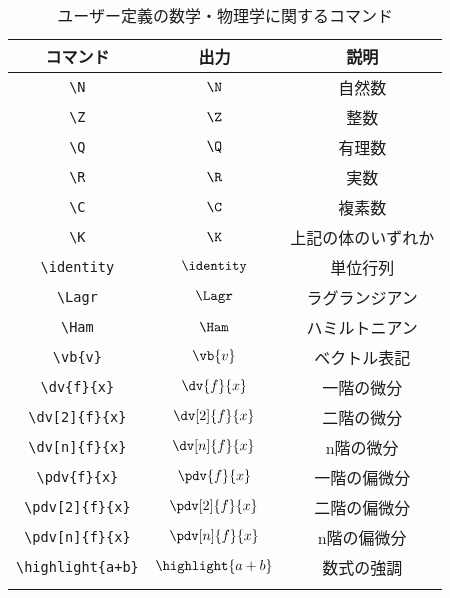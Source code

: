 \begin{longtable}{ccc}
    \toprule
    コマンド               & 出力                              & 説明               \\
    \midrule
    \verb|\N|              & \(\N\)                            & 自然数             \\
    \verb|\Z|              & \(\Z\)                            & 整数               \\
    \verb|\Q|              & \(\Q\)                            & 有理数             \\
    \verb|\R|              & \(\R\)                            & 実数               \\
    \verb|\C|              & \(\C\)                            & 複素数             \\
    \verb|\K|              & \(\K\)                            & 上記の体のいずれか \\
    \verb|\identity|       & \(\identity\)                     & 単位行列           \\
    \verb|\Lagr|           & \(\Lagr\)                         & ラグランジアン     \\
    \verb|\Ham|            & \(\Ham\)                          & ハミルトニアン     \\
    \verb|\vb{v}|          & \(\vb{v}\)                        & ベクトル表記       \\
    \verb|\dv{f}{x}|       & \(\displaystyle \dv{f}{x}\)       & 一階の微分         \\
    \verb|\dv[2]{f}{x}|    & \(\displaystyle \dv[2]{f}{x}\)    & 二階の微分         \\
    \verb|\dv[n]{f}{x}|    & \(\displaystyle \dv[n]{f}{x}\)    & n階の微分          \\
    \verb|\pdv{f}{x}|      & \(\displaystyle \pdv{f}{x}\)      & 一階の偏微分       \\
    \verb|\pdv[2]{f}{x}|   & \(\displaystyle \pdv[2]{f}{x}\)   & 二階の偏微分       \\
    \verb|\pdv[n]{f}{x}|   & \(\displaystyle \pdv[n]{f}{x}\)   & n階の偏微分        \\
    \verb|\highlight{a+b}| & \(\displaystyle \highlight{a+b}\) & 数式の強調         \\
    \bottomrule
    \caption{ユーザー定義の数学・物理学に関するコマンド}
    \label{tab:user_defined_math_physics_commands}
\end{longtable}